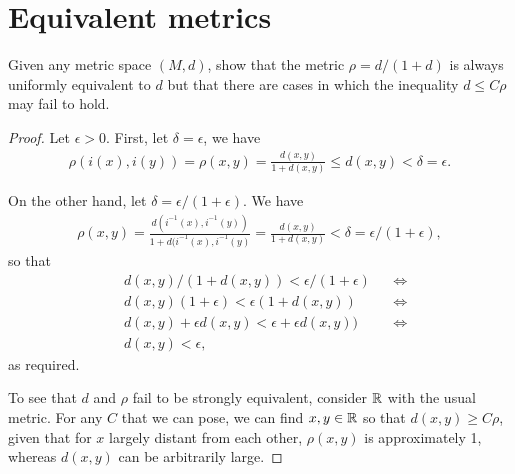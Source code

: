 \section{Equivalent metrics}


\begin{exercise}{73}
Given any metric space $(M,d)$, show that the metric $\rho = d/(1+d)$ is always uniformly equivalent to $d$ but that there are cases in which the inequality $d\leq C\rho$ may fail to hold.
\end{exercise}
\begin{proof}
Let $\epsilon > 0$.
First, let $\delta=\epsilon$, we have 
\begin{align*}
    \rho(i(x),i(y)) 
    = \rho(x,y)
    = \frac{d(x,y)}{1+d(x,y)}
    \leq d(x,y) 
    < \delta
    = \epsilon.
\end{align*}

On the other hand, let $\delta = \epsilon/(1+\epsilon)$.
We have
\begin{align*}
    \rho(x,y)
    = \frac{d(i^{-1}(x),i^{-1}(y))}{1 + d(i^{-1}(x),i^{-1}(y)}
    = \frac{d(x,y)}{1 + d(x,y)}
    < \delta
    = \epsilon/(1+\epsilon),
\end{align*}
so that 
\begin{align*}
    &d(x,y)/(1+d(x,y)) < \epsilon/(1+\epsilon) &&\iff\\
    &d(x,y)(1+\epsilon) < \epsilon(1+d(x,y))  &&\iff\\
    &d(x,y) + \epsilon d(x,y) < \epsilon + \epsilon d(x,y))  &&\iff\\
    & d(x,y) < \epsilon,
\end{align*}
as required.

To see that $d$ and $\rho$ fail to be strongly equivalent, consider $\mathbb{R}$ with the usual metric.
For any $C$ that we can pose, we can find $x,y\in\mathbb{R}$ so that $d(x,y)\geq C\rho$, given that for $x$ largely distant from each other, $\rho(x,y)$ is approximately 1, whereas $d(x,y)$ can be arbitrarily large.
\end{proof} 

